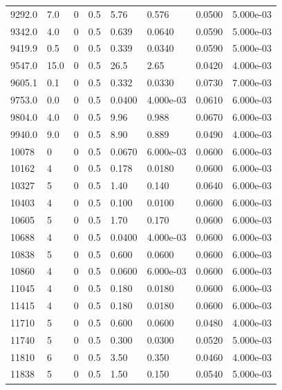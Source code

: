 \documentclass[preview]{standalone}
\begin{document}
{{{{\begin{tabular}{L{1.2cm}C{1.2cm} C{0.3cm}C{0.5cm} C{1.4cm}C{1.4cm} C{1.4cm}C{1.4cm}}
  9292.0  &   7.0  & 0     & 0.5 &  5.76  & 0.576  & 0.0500 &  5.000e-03   \\ 
  9342.0  &   4.0  & 0     & 0.5 &  0.639  & 0.0640  & 0.0590 &  5.000e-03   \\ 
  9419.9  &   0.5  & 0     & 0.5 &  0.339  & 0.0340  & 0.0590 &  5.000e-03   \\ 
  9547.0  &  15.0  & 0     & 0.5 &  26.5  & 2.65  & 0.0420 &  4.000e-03   \\ 
  9605.1  &   0.1  & 0     & 0.5 &  0.332  & 0.0330  & 0.0730 &  7.000e-03   \\ 
  9753.0  &   0.0  & 0     & 0.5 &  0.0400  & 4.000e-03  & 0.0610 &  6.000e-03   \\ 
  9804.0  &   4.0  & 0     & 0.5 &  9.96  & 0.988  & 0.0670 &  6.000e-03   \\ 
  9940.0  &   9.0  & 0     & 0.5 &  8.90  & 0.889  & 0.0490 &  4.000e-03   \\ 
  10078  &     0  & 0     & 0.5 &  0.0670  & 6.000e-03  & 0.0600 &  6.000e-03   \\ 
  10162  &     4  & 0     & 0.5 &  0.178  & 0.0180  & 0.0600 &  6.000e-03   \\ 
  10327  &     5  & 0     & 0.5 &  1.40  & 0.140  & 0.0640 &  6.000e-03   \\ 
  10403  &     4  & 0     & 0.5 &  0.100  & 0.0100  & 0.0600 &  6.000e-03   \\ 
  10605  &     5  & 0     & 0.5 &  1.70  & 0.170  & 0.0600 &  6.000e-03   \\ 
  10688  &     4  & 0     & 0.5 &  0.0400  & 4.000e-03  & 0.0600 &  6.000e-03   \\ 
  10838  &     5  & 0     & 0.5 &  0.600  & 0.0600  & 0.0600 &  6.000e-03   \\ 
  10860  &     4  & 0     & 0.5 &  0.0600  & 6.000e-03  & 0.0600 &  6.000e-03   \\ 
  11045  &     4  & 0     & 0.5 &  0.180  & 0.0180  & 0.0600 &  6.000e-03   \\ 
  11415  &     4  & 0     & 0.5 &  0.180  & 0.0180  & 0.0600 &  6.000e-03   \\ 
  11710  &     5  & 0     & 0.5 &  0.600  & 0.0600  & 0.0480 &  4.000e-03   \\ 
  11740  &     5  & 0     & 0.5 &  0.300  & 0.0300  & 0.0520 &  5.000e-03   \\ 
  11810  &     6  & 0     & 0.5 &  3.50  & 0.350  & 0.0460 &  4.000e-03   \\ 
  11838  &     5  & 0     & 0.5 &  1.50  & 0.150  & 0.0540 &  5.000e-03   \\ 

\end{tabular}}}}}
\end{document}
